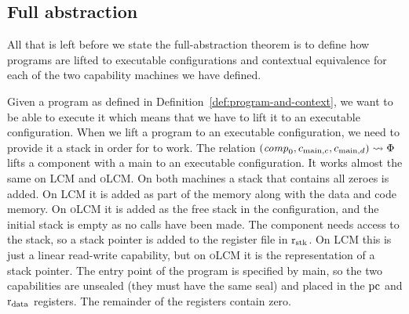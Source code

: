 \documentclass[acmsmall,review,anonymous]{acmart}\settopmatter{printfolios=true,printccs=false,printacmref=false}
\renewcommand{\comp}{\var{comp}}
\newcommand{\trgcm}{\textsc{LCM}}
\newcommand{\srccm}{\textsc{oLCM}}
\begin{document}
\subsection{Full abstraction}
All that is left before we state the full-abstraction theorem is to define how programs are lifted to executable configurations and contextual equivalence for each of the two capability machines we have defined.

Given a program as defined in Definition~\ref{def:program-and-context}, we want to be able to execute it which means that we have to lift it to an executable configuration.
When we lift a program to an executable configuration, we need to provide it a stack in order for \stktokens{} to work.
The relation $(\comp_0, c_{\mathrm{main},c}, c_{\mathrm{main},d}) \rightsquigarrow \Phi$ lifts a component with a main to an executable configuration.
It works almost the same on \trgcm{} and \srccm{}.
On both machines a stack that contains all zeroes is added.
On \trgcm{} it is added as part of the memory along with the data and code memory.
On \srccm{} it is added as the free stack in the configuration, and the initial stack is empty as no calls have been made.
The component needs access to the stack, so a stack pointer is added to the register file in $\mathrm{r}_\mathrm{stk}$.
On \trgcm{} this is just a linear read-write capability, but on \srccm{} it is the representation of a stack pointer.
The entry point of the program is specified by main, so the two capabilities are unsealed (they must have the same seal) and placed in the $\mathrm{pc}$ and $\mathrm{r}_\mathrm{data}$ registers.
The remainder of the registers contain zero.
\end{document}
